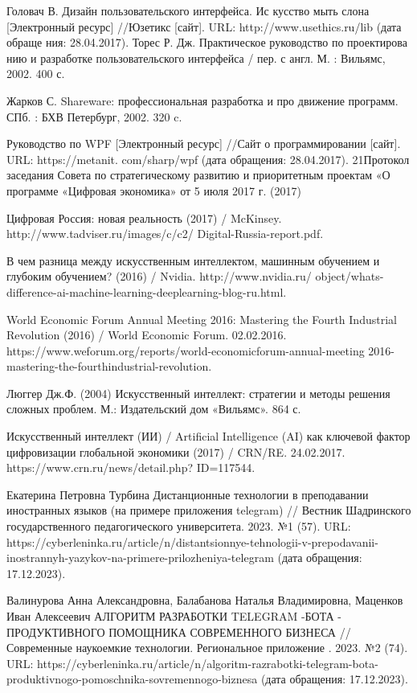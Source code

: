 \documentclass{article}
\begin{document}
Головач В. Дизайн пользовательского интерфейса. Ис  кусство мыть слона [Электронный ресурс] //Юзетикс [сайт]. URL: http://www.usethics.ru/lib (дата обраще  ния: 28.04.2017).
Торес Р. Дж. Практическое руководство по проектирова  нию и разработке пользовательского интерфейса / пер. с англ. М. : Вильямс, 2002. 400 с.

 Жарков С. Shareware: профессиональная разработка и про  движение программ. СПб. : БХВ Петербург, 2002. 320 c.

 Руководство по WPF [Электронный ресурс] //Сайт о программировании [сайт]. URL: https://metanit. com/sharp/wpf (дата обращения: 28.04.2017). 
21Протокол заседания Совета по стратегическому развитию и приоритетным проектам «О программе «Цифровая экономика» от 5 июля 2017 г. (2017) 

 Цифровая Россия: новая реальность (2017) / McKinsey. http://www.tadviser.ru/images/c/c2/ Digital-Russia-report.pdf.

 В чем разница между искусственным интеллектом, машинным обучением и глубоким обучением? (2016) / Nvidia. http://www.nvidia.ru/ object/whats-difference-ai-machine-learning-deeplearning-blog-ru.html. 

World Economic Forum Annual Meeting 2016: Mastering the Fourth Industrial Revolution (2016) / World Economic Forum. 02.02.2016. https://www.weforum.org/reports/world-economicforum-annual-meeting 2016-mastering-the-fourthindustrial-revolution. 

Люггер Дж.Ф. (2004) Искусственный интеллект: стратегии и методы решения сложных проблем. М.: Издательский дом «Вильямс». 864 с.

Искусственный интеллект (ИИ) / Artificial Intelligence (AI) как ключевой фактор цифровизации глобальной экономики (2017) / CRN/RE. 24.02.2017. https://www.crn.ru/news/detail.php? ID=117544.

Екатерина Петровна Турбина Дистанционные технологии в преподавании иностранных языков (на примере приложения telegram) // Вестник Шадринского государственного педагогического университета. 2023. №1 (57). URL: https://cyberleninka.ru/article/n/distantsionnye-tehnologii-v-prepodavanii-inostrannyh-yazykov-na-primere-prilozheniya-telegram (дата обращения: 17.12.2023).

Валинурова Анна Александровна, Балабанова Наталья Владимировна, Маценков Иван Алексеевич АЛГОРИТМ РАЗРАБОТКИ TELEGRAM -БОТА - ПРОДУКТИВНОГО ПОМОЩНИКА СОВРЕМЕННОГО БИЗНЕСА // Современные наукоемкие технологии. Региональное приложение . 2023. №2 (74). URL: https://cyberleninka.ru/article/n/algoritm-razrabotki-telegram-bota-produktivnogo-pomoschnika-sovremennogo-biznesa (дата обращения: 17.12.2023).
\end{document}
